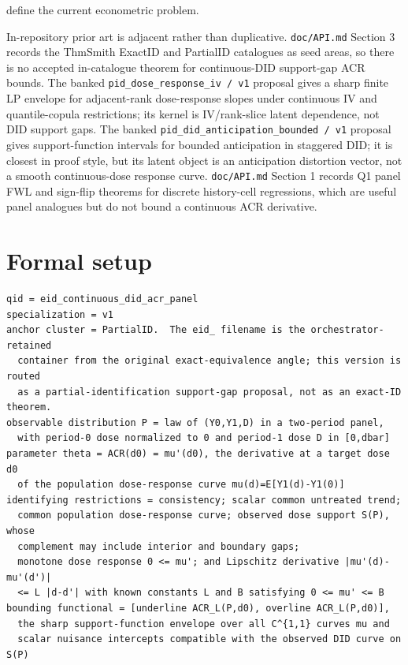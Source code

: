 \documentclass[11pt]{article}
\theoremstyle{definition}
\theoremstyle{plain}
\theoremstyle{remark}
\begin{document}
define the current econometric problem.

In-repository prior art is adjacent rather than duplicative.  \texttt{doc/API.md} Section 3 records the ThmSmith ExactID and PartialID catalogues as seed areas, so there is no accepted in-catalogue theorem for continuous-DID support-gap ACR bounds.  The banked \texttt{pid\_dose\_response\_iv / v1} proposal gives a sharp finite LP envelope for adjacent-rank dose-response slopes under continuous IV and quantile-copula restrictions; its kernel is IV/rank-slice latent dependence, not DID support gaps.  The banked \texttt{pid\_did\_anticipation\_bounded / v1} proposal gives support-function intervals for bounded anticipation in staggered DID; it is closest in proof style, but its latent object is an anticipation distortion vector, not a smooth continuous-dose response curve.  \texttt{doc/API.md} Section 1 records Q1 panel FWL and sign-flip theorems for discrete history-cell regressions, which are useful panel analogues but do not bound a continuous ACR derivative.

\section{Formal setup}
\begin{verbatim}
qid = eid_continuous_did_acr_panel
specialization = v1
anchor cluster = PartialID.  The eid_ filename is the orchestrator-retained
  container from the original exact-equivalence angle; this version is routed
  as a partial-identification support-gap proposal, not as an exact-ID theorem.
observable distribution P = law of (Y0,Y1,D) in a two-period panel,
  with period-0 dose normalized to 0 and period-1 dose D in [0,dbar]
parameter theta = ACR(d0) = mu'(d0), the derivative at a target dose d0
  of the population dose-response curve mu(d)=E[Y1(d)-Y1(0)]
identifying restrictions = consistency; scalar common untreated trend;
  common population dose-response curve; observed dose support S(P), whose
  complement may include interior and boundary gaps;
  monotone dose response 0 <= mu'; and Lipschitz derivative |mu'(d)-mu'(d')|
  <= L |d-d'| with known constants L and B satisfying 0 <= mu' <= B
bounding functional = [underline ACR_L(P,d0), overline ACR_L(P,d0)],
  the sharp support-function envelope over all C^{1,1} curves mu and
  scalar nuisance intercepts compatible with the observed DID curve on S(P)
\end{verbatim}
\end{document}
